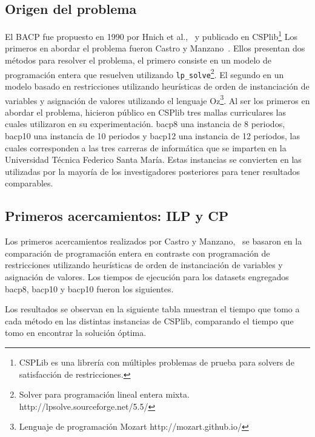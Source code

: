 \documentclass[letterpaper,10pt]{article}
\begin{document}
\subsection{Origen del problema}

El BACP fue propuesto en 1990 por Hnich et al.,~\cite{csplibprob030} y publicado en CSPlib\footnote{CSPLib es una librería con múltiples problemas de prueba para solvers de satisfacción de restricciones.}
Los primeros en abordar el problema fueron Castro y Manzano~\cite{DBLP:journals/corr/cs-PL-0110007}. Ellos presentan dos métodos para resolver el problema, el primero consiste en un modelo de programación entera que resuelven utilizando \verb+lp_solve+\footnote{Solver para programación lineal entera mixta. http://lpsolve.sourceforge.net/5.5/}. El segundo en un modelo basado en restricciones utilizando heurísticas de orden de instanciación de variables y asignación de valores utilizando el lenguaje Oz\footnote{Lenguaje de programación Mozart http://mozart.github.io/}. Al ser los primeros en abordar el problema, hicieron público en CSPlib tres mallas curriculares las cuales utilizaron en su experimentación. bacp8 una instancia de 8 periodos, bacp10 una instancia de 10 periodos y bacp12 una instancia de 12 periodos, las cuales corresponden a las tres carreras de informática que se imparten en la Universidad Técnica Federico Santa María. Estas instancias se convierten en las utilizadas por la mayoría de los investigadores posteriores para tener resultados comparables.

\subsection{Primeros acercamientos: ILP y CP}

Los primeros acercamientos realizados por Castro y Manzano,~\cite{DBLP:journals/corr/cs-PL-0110007} se basaron en la comparación de programación entera en contraste con programación de restricciones utilizando heurísticas de orden de instanciación de variables y asignación de valores. Los tiempos de ejecución para los datasets engregados bacp8, bacp10 y bacp10 fueron los siguientes.

Los resultados se observan en la siguiente tabla muestran el tiempo que tomo a cada método en las distintas instancias de CSPlib, comparando el tiempo que tomo en encontrar la solución óptima.
\end{document}
